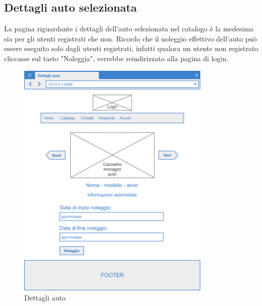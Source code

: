 \documentclass[12pt,a4paperS]{report}
\begin{document}
\begin{normalsize}
			\subsection{Dettagli auto selezionata}
				La pagina riguardante i dettagli dell'auto selezionata nel catalogo è la medesima sia per gli utenti registrati che non.
				\newline
				Ricordo che il noleggio effettivo dell'auto può essere eseguito solo dagli utenti registrati, infatti qualora un utente non registrato cliccasse sul tasto "Noleggia", verrebbe reindirizzato alla pagina di login.
				\newline
				\begin{figure}[H]
					\centering
					\includegraphics[width=0.82\textwidth, height=0.82\textheight, keepaspectratio]{Mockup/Dettagli_auto.png}
					\caption{Dettagli auto}
				\end{figure}
			

\end{normalsize}
\end{document}
